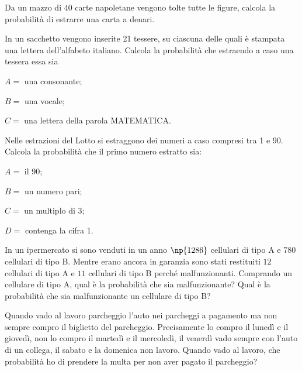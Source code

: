 \begin{esercizio}
 \label{ese:9.22}
Da un mazzo di 40 carte napoletane vengono tolte tutte le figure, calcola la probabilità di estrarre una carta a denari.
\end{esercizio}

\begin{esercizio}
 \label{ese:9.23}
In un sacchetto vengono inserite 21 tessere, su ciascuna delle quali è stampata una lettera dell'alfabeto italiano. Calcola la probabilità che estraendo a caso una tessera essa sia
\begin{itemize*}
\item $ A= $ una consonante;
\item $ B= $ una vocale;
\item $ C= $ una lettera della parola MATEMATICA.
\end{itemize*}
\end{esercizio}

\begin{esercizio}
 \label{ese:9.24}
Nelle estrazioni del Lotto si estraggono dei numeri a caso compresi tra 1 e 90. Calcola la probabilità che il primo numero estratto sia:
\begin{itemize*}
\item $ A= $ il 90;
\item $ B= $ un numero pari;
\item $ C= $ un multiplo di 3;
\item $ D= $ contenga la cifra 1.
\end{itemize*}
\end{esercizio}

\begin{esercizio}
 \label{ese:9.25}
In un ipermercato si sono venduti in un anno $\np{1286}$ cellulari di tipo A e $780$ cellulari di tipo B. Mentre erano ancora in garanzia sono stati restituiti $12$ cellulari di tipo A e $11$ cellulari di tipo B perché malfunzionanti. Comprando un cellulare di tipo A, qual è la probabilità che sia malfunzionante? Qual è la probabilità che sia malfunzionante un cellulare di tipo B?
\end{esercizio}

\begin{esercizio}
 \label{ese:9.26}
Quando vado al lavoro parcheggio l'auto nei parcheggi a pagamento ma non sempre compro il biglietto del parcheggio. Precisamente lo compro il lunedì e il giovedì, non lo compro il martedì e il mercoledì, il venerdì vado sempre con l'auto di un collega, il sabato e la domenica non lavoro. Quando vado al lavoro, che probabilità ho di prendere la multa per non aver pagato il parcheggio?
\end{esercizio}

